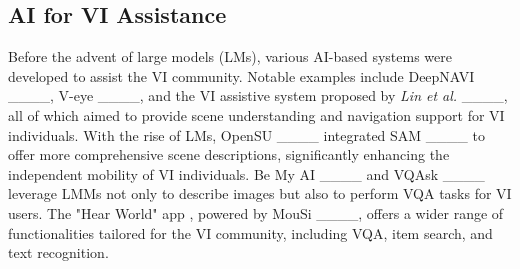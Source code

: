 \subsection{AI for VI Assistance}
Before the advent of large models (LMs), various AI-based systems were developed to assist the VI community. Notable examples include DeepNAVI ____, V-eye ____, and the VI assistive system proposed by \textit{Lin et al.} ____, all of which aimed to provide scene understanding and navigation support for VI individuals. With the rise of LMs, OpenSU ____ integrated SAM ____ to offer more comprehensive scene descriptions, significantly enhancing the independent mobility of VI individuals. Be My AI ____ and VQAsk ____ leverage LMMs not only to describe images but also to perform VQA tasks for VI users. The "Hear World" app , powered by MouSi ____, offers a wider range of functionalities tailored for the VI community, including VQA, item search, and text recognition.